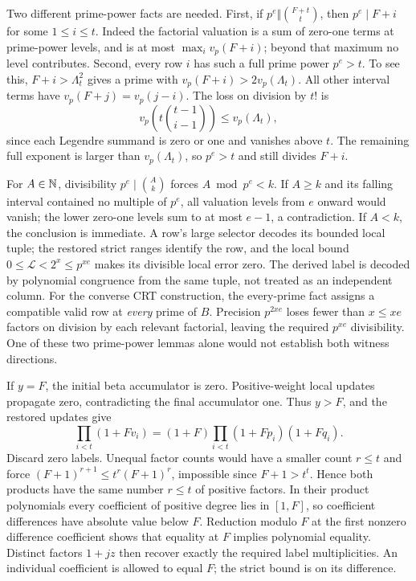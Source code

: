 Two different prime-power facts are needed. First, if
$p^e\Vert\binom{F+t}{t}$, then $p^e\mid F+i$ for some
$1\le i\le t$. Indeed the factorial valuation is a sum of zero-one
terms at prime-power levels, and is at most
$\max_i v_p(F+i)$; beyond that maximum no level contributes.
Second, every row $i$ has such a full prime power $p^e>t$.
To see this, $F+i>\Lambda_t^2$ gives a prime with
$v_p(F+i)>2v_p(\Lambda_t)$. All other interval terms have
$v_p(F+j)=v_p(j-i)$. The loss on division by $t!$ is
\[
 v_p\left(t\binom{t-1}{i-1}\right)\le v_p(\Lambda_t),
\]
since each Legendre summand is zero or one and vanishes above $t$.
The remaining full exponent is larger than $v_p(\Lambda_t)$, so
$p^e>t$ and still divides $F+i$.

For $A\in\mathbb N$, divisibility $p^e\mid\binom Ak$ forces
$A\bmod p^e<k$. If $A\ge k$ and its falling interval contained
no multiple of $p^e$, all valuation levels from $e$ onward would
vanish; the lower zero-one levels sum to at most $e-1$, a contradiction.
If $A<k$, the conclusion is immediate. A row's large selector decodes
its bounded local tuple; the restored strict ranges identify the row,
and the local bound $0\le\mathcal L<2^x\le p^{xe}$ makes its
divisible local error zero. The derived label is decoded by polynomial
congruence from the same tuple, not treated as an independent column.
For the converse CRT construction, the every-prime fact assigns a
compatible valid row at \emph{every} prime of $B$. Precision $p^{2xe}$
loses fewer than $x\le xe$ factors on division by each relevant factorial,
leaving the required $p^{xe}$ divisibility. One of these two prime-power
lemmas alone would not establish both witness directions.

If $y=F$, the initial beta accumulator is zero. Positive-weight local
updates propagate zero, contradicting the final accumulator one.
Thus $y>F$, and the restored updates give
\[
 \prod_{i<t}(1+Fv_i)=(1+F)\prod_{i<t}(1+Fp_i)(1+Fq_i).
\]
Discard zero labels. Unequal factor counts would have a smaller count
$r\le t$ and force $(F+1)^{r+1}\le t^r(F+1)^r$, impossible
since $F+1>t^t$. Hence both products have the same number $r\le t$
of positive factors. In their product polynomials every coefficient of
positive degree lies in $[1,F]$, so coefficient differences have absolute
value below $F$. Reduction modulo $F$ at the first nonzero difference
coefficient shows that equality at $F$ implies polynomial equality.
Distinct factors $1+jz$ then recover exactly the required label
multiplicities. An individual coefficient is allowed to equal $F$;
the strict bound is on its difference.

